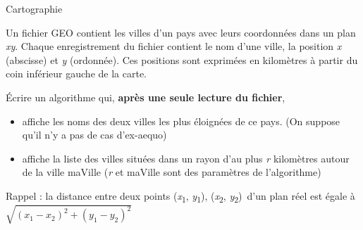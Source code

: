 \begin{Exercice}{Cartographie}

	Un fichier GEO contient les villes d’un pays avec
	leurs coordonnées dans un plan
	\textit{xy}. Chaque
	enregistrement du fichier contient le nom d’une ville, la position
	\textit{x} (abscisse) et
	\textit{y} (ordonnée). Ces
	positions sont exprimées en kilomètres à partir du coin inférieur
	gauche de la carte.

	Écrire un algorithme qui,
	\textbf{après une seule lecture du
	fichier}, 

	\begin{itemize}
		\item
			affiche les noms des deux villes les plus éloignées de ce pays. (On
			suppose qu’il n’y a pas de cas d’ex-aequo)
		\item 
			affiche la liste des villes situées dans un rayon d’au
			plus \textit{r} kilomètres autour
			de la ville maVille
			(\textit{r} et maVille sont des
			paramètres de l’algorithme)
	\end{itemize}
	
	Rappel : la distance entre deux
	points
	(\textit{x}\textsubscript{1},
	\textit{y}\textsubscript{1}),
	(\textit{x}\textsubscript{2},
	\textit{y}\textsubscript{2})~d’un
	plan réel est égale à
	\\
	\begin{math}
		\sqrt{{(x_1 - x_2)}^2 + {(y_1 - y_2)}^2}
	\end{math}
\end{Exercice}

